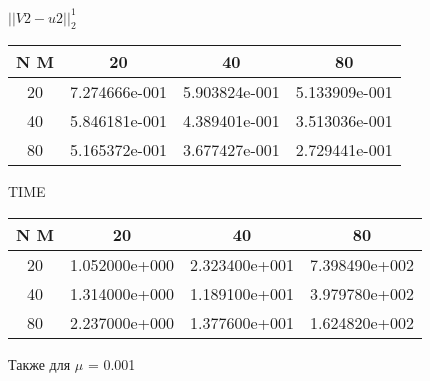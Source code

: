 \begin{center}
	$||V2 - u2||_{2}^1$
	\begin{tabular}{|c|c|c|c|}
		\hline 
		N  M& 20& 40& 80\\ 
		\hline 
		20 & 7.274666e-001 & 5.903824e-001 & 5.133909e-001 \\ \hline 
		40 & 5.846181e-001 & 4.389401e-001 & 3.513036e-001 \\ \hline 
		80 & 5.165372e-001 & 3.677427e-001 & 2.729441e-001 \\ \hline 
		\hline 
	\end{tabular} 
\end{center} 
\begin{center}
	TIME
	\begin{tabular}{|c|c|c|c|}
		\hline 
		N  M& 20& 40& 80\\ 
		\hline 
		20 & 1.052000e+000 & 2.323400e+001 & 7.398490e+002 \\ \hline 
		40 & 1.314000e+000 & 1.189100e+001 & 3.979780e+002 \\ \hline 
		80 & 2.237000e+000 & 1.377600e+001 & 1.624820e+002 \\ \hline 
		\hline 
	\end{tabular} 
\end{center} 

Также для $\mu$ = 0.001

